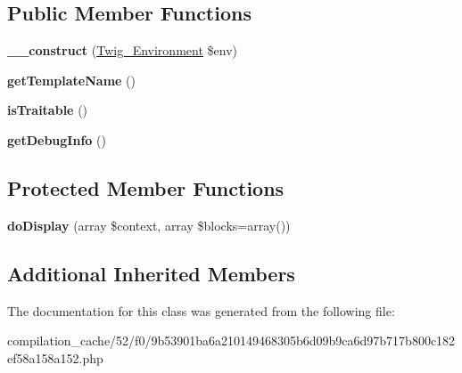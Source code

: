 \subsection*{Public Member Functions}
\begin{DoxyCompactItemize}
\item 
\hypertarget{class_____twig_template__52f09b53901ba6a210149468305b6d09b9ca6d97b717b800c182ef58a158a152_a4f8326243132c1450a81e0a817aa1be7}{}{\bfseries \+\_\+\+\_\+construct} (\hyperlink{class_twig___environment}{Twig\+\_\+\+Environment} \$env)\label{class_____twig_template__52f09b53901ba6a210149468305b6d09b9ca6d97b717b800c182ef58a158a152_a4f8326243132c1450a81e0a817aa1be7}

\item 
\hypertarget{class_____twig_template__52f09b53901ba6a210149468305b6d09b9ca6d97b717b800c182ef58a158a152_a621a3ccd148ed8b9e937da6959c98f39}{}{\bfseries get\+Template\+Name} ()\label{class_____twig_template__52f09b53901ba6a210149468305b6d09b9ca6d97b717b800c182ef58a158a152_a621a3ccd148ed8b9e937da6959c98f39}

\item 
\hypertarget{class_____twig_template__52f09b53901ba6a210149468305b6d09b9ca6d97b717b800c182ef58a158a152_aa9eb89be270f6afc256ef5e272b78a63}{}{\bfseries is\+Traitable} ()\label{class_____twig_template__52f09b53901ba6a210149468305b6d09b9ca6d97b717b800c182ef58a158a152_aa9eb89be270f6afc256ef5e272b78a63}

\item 
\hypertarget{class_____twig_template__52f09b53901ba6a210149468305b6d09b9ca6d97b717b800c182ef58a158a152_abd0ecb0136f4228db2bd963bfc1e20d7}{}{\bfseries get\+Debug\+Info} ()\label{class_____twig_template__52f09b53901ba6a210149468305b6d09b9ca6d97b717b800c182ef58a158a152_abd0ecb0136f4228db2bd963bfc1e20d7}

\end{DoxyCompactItemize}
\subsection*{Protected Member Functions}
\begin{DoxyCompactItemize}
\item 
\hypertarget{class_____twig_template__52f09b53901ba6a210149468305b6d09b9ca6d97b717b800c182ef58a158a152_adb62b7c226e07d30f836ed16158d924f}{}{\bfseries do\+Display} (array \$context, array \$blocks=array())\label{class_____twig_template__52f09b53901ba6a210149468305b6d09b9ca6d97b717b800c182ef58a158a152_adb62b7c226e07d30f836ed16158d924f}

\end{DoxyCompactItemize}
\subsection*{Additional Inherited Members}


The documentation for this class was generated from the following file\+:\begin{DoxyCompactItemize}
\item 
compilation\+\_\+cache/52/f0/9b53901ba6a210149468305b6d09b9ca6d97b717b800c182ef58a158a152.\+php\end{DoxyCompactItemize}
